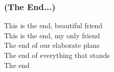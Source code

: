

\subsubsection*{(The End...)}

\begin{envRespuesta}
This is the end, beautiful friend\\
This is the end, my only friend\\
The end of our elaborate plans\\
The end of everything that stands\\
The end\\
\end{envRespuesta}
